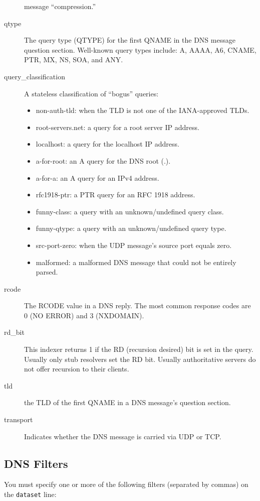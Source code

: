 \documentclass{report}
\begin{document}
\begin{description}
	message ``compression.''
\item[qtype]
	The query type (QTYPE) for the first QNAME in the DNS message
	question section.  Well-known query types include: A, AAAA,
	A6, CNAME, PTR, MX, NS, SOA, and ANY.
\item[query\_classification]
	A stateless classification of ``bogus'' queries:
	\begin{itemize}
	\setlength{\itemsep}{0ex plus 0.5ex minus 0.0ex}
	\item non-auth-tld: when the TLD is not one of the IANA-approved TLDs.
	\item root-servers.net: a query for a root server IP address.
	\item localhost: a query for the localhost IP address.
	\item a-for-root: an A query for the DNS root (.).
	\item a-for-a: an A query for an IPv4 address.
	\item rfc1918-ptr: a PTR query for an RFC 1918 address.
	\item funny-class: a query with an unknown/undefined query class.
	\item funny-qtype: a query with an unknown/undefined query type.
	\item src-port-zero: when the UDP message's source port equals zero.
	\item malformed: a malformed DNS message that could not be entirely parsed.
	\end{itemize}
\item[rcode]
	The RCODE value in a DNS reply.  The most common response
	codes are 0 (NO ERROR) and 3 (NXDOMAIN). 
\item[rd\_bit]
	This indexer returns 1 if the RD (recursion desired) bit is
	set in the query.  Usually only stub resolvers set the RD bit.
	Usually authoritative servers do not offer recursion to their
	clients.
\item[tld]
	the TLD of the first QNAME in a DNS message's question section.
\item[transport]
	Indicates whether the DNS message is carried via UDP or TCP\@.
\end{description}

\subsection{DNS Filters}

You must specify one or more of the following filters (separated by commas) on
the {\tt dataset\/} line:
\end{document}
